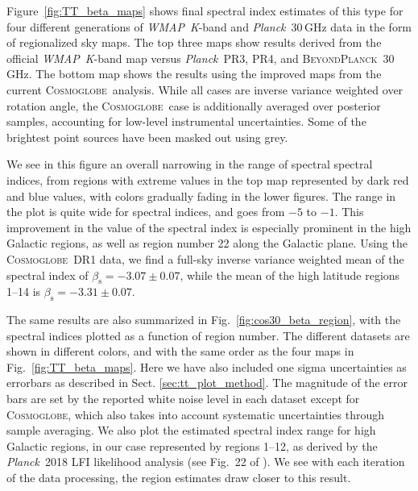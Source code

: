 \documentclass[twocolumn]{../../common/aa}
\def\WMAP{\emph{WMAP}}
\def\Planck{\emph{Planck}}
\newcommand{\bp}{\textsc{BeyondPlanck}}
\newcommand{\cosmoglobe}{\textsc{Cosmoglobe}}
\newcommand{\K}[0]{\textit K}
\begin{document}
Figure~\ref{fig:TT_beta_maps} shows final spectral index estimates of this type for four different generations of \WMAP\ \K-band and \Planck\ 30\,GHz data in the form of regionalized sky maps. The top three maps show results derived from the official \WMAP\ \K-band map versus \Planck\ PR3, PR4, and \bp\ 30\,GHz. The bottom map shows the results using the improved maps from the current \cosmoglobe\ analysis. While all cases are inverse variance weighted over rotation angle, the \cosmoglobe\ case is additionally averaged over posterior samples, accounting for low-level instrumental uncertainties. Some of the brightest point sources have been masked out using grey.

We see in this figure an overall narrowing in the range of spectral spectral indices, from regions with extreme values in the top map represented by dark red and blue values, with colors gradually fading in the lower figures. The range in the plot is quite wide for spectral indices, and goes from $-5$ to $-1$. This improvement in the value of the spectral index is especially prominent in the high Galactic regions, as well as region  number 22 along the Galactic plane.  Using the \cosmoglobe\ DR1 data, we find a full-sky inverse variance weighted mean of the spectral index of $\beta_{\mathrm{s}}=-3.07\pm0.07$, while the mean of the high latitude regions 1--14 is $\beta_{\mathrm{s}}=-3.31\pm0.07$.


The same results are also summarized in Fig.~\ref{fig:cos30_beta_region}, with the spectral indices plotted as a function of region number. The different datasets are shown in different colors, and with the same order as the four maps in Fig.~\ref{fig:TT_beta_maps}. Here we have also included one sigma uncertainties as errorbars as described in Sect. \ref{sec:tt_plot_method}. The magnitude of the error bars are set by the reported white noise level in each dataset except for \cosmoglobe, which also takes into account systematic uncertainties through sample averaging. We also plot the estimated spectral index range for high Galactic regions, in our case represented by regions 1--12, as derived by the \Planck\ 2018 LFI likelihood analysis (see Fig.~22 of \citealp{planck2016-l05}). We see with each iteration of the data processing, the region estimates draw closer to this result.
\end{document}
